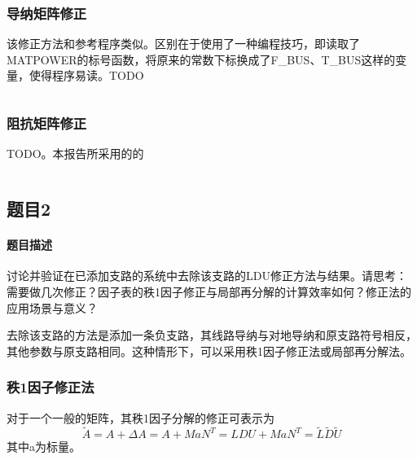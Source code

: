 \documentclass[a4paper,12pt]{article}
\begin{document}
    \subsubsection{导纳矩阵修正}
    该修正方法和参考程序类似。区别在于使用了一种编程技巧，即读取了MATPOWER的标号函数，将原来的常数下标换成了F\_BUS、T\_BUS这样的变量，使得程序易读。TODO
    \begin{lstlisting}[style=Matlab-editor,basicstyle=\mlttfamily,label=lst:q2q1p1,caption={导纳矩阵修正程序}]
    \end{lstlisting}
    \subsubsection{阻抗矩阵修正}
    TODO。本报告所采用的的
    \begin{lstlisting}[style=Matlab-editor,basicstyle=\mlttfamily,label=lst:q2q1p2,caption={阻抗矩阵修正程序}]
    \end{lstlisting}
    \subsection{题目2}
    \paragraph{题目描述} 讨论并验证在已添加支路的系统中去除该支路的LDU修正方法与结果。请思考：需要做几次修正？因子表的秩1因子修正与局部再分解的计算效率如何？修正法的应用场景与意义？

    去除该支路的方法是添加一条负支路，其线路导纳与对地导纳和原支路符号相反，其他参数与原支路相同。这种情形下，可以采用秩1因子修正法或局部再分解法。

    \subsubsection{秩1因子修正法}
    对于一个一般的矩阵，其秩1因子分解的修正可表示为
    \begin{equation}
      \label{eq:r1eq}
      \widetilde A = A + \Delta A = A + MaN^T = LDU + MaN^T = \widetilde L \widetilde D \widetilde U
    \end{equation}
    其中a为标量。
\end{document}
